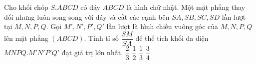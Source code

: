 \begin{ex}%
	Cho khối chóp $S.ABCD$ có đáy $ABCD$ là hình chữ nhật. Một mặt phẳng thay đổi nhưng luôn song song với đáy và cắt các cạnh bên $SA, SB, SC, SD$ lần lượt tại $M, N, P, Q$. Gọi $M', N', P', Q'$ lần lượt là hình chiếu vuông góc của $M, N, P, Q$ lên mặt phẳng $\left(ABCD\right)$. Tính tỉ số $\dfrac{SM}{SA}$ để thể tích khối đa diện $MNPQ.M'N'P'Q'$ đạt giá trị lớn nhất.
	\choice
	{\True $\dfrac{2}{3}$}
	{$\dfrac{1}{2}$}
	{$\dfrac{1}{3}$}
	{$\dfrac{3}{4}$}
\end{ex}
